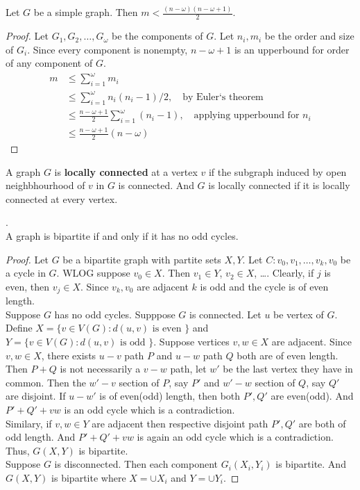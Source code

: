 \begin{exercise}
	Let $G$ be a simple graph.
	Then $m < \frac{(n-\omega)(n-\omega+1)}{2}$.
\end{exercise}
\begin{proof}
	Let $G_1,G_2,\dots,G_\omega$ be the components of $G$.
	Let $n_i,m_i$ be the order and size of $G_i$.
	Since every component is nonempty, $n-\omega+1$ is an upperbound for order of any component of $G$.
	\begin{align*}
		m 
		& \le \sum_{i=1}^\omega m_i\\
		& \le \sum_{i=1}^\omega n_i(n_i-1)/2,\quad \text{by Euler`s theorem}\\
		& \le \frac{n-\omega+1}{2} \sum_{i=1}^\omega (n_i - 1),\quad \text{applying upperbound for $n_i$}\\
		& \le \frac{n-\omega+1}{2} (n - \omega)
	\end{align*}
\end{proof}

\begin{definition}
	A graph $G$ is \textbf{locally connected} at a vertex $v$ if the subgraph induced by open neighbhourhood of $v$ in $G$ is connected.
	And $G$ is locally connected if it is locally connected at every vertex.
\end{definition}

\begin{theorem}.\\
	A graph is bipartite if and only if it has no odd cycles.
\end{theorem}
\begin{proof}
	Let $G$ be a bipartite graph with partite sets $X,Y$.
	Let $C : v_0,v_1,\dots,v_k,v_0$ be a cycle in $G$.
	WLOG suppose $v_0 \in X$.
	Then $v_1 \in Y$, $v_2 \in X$, \dots.
	Clearly, if $j$ is even, then $v_j \in X$.
	Since $v_k,v_0$ are adjacent $k$ is odd and the cycle is of even length.\\

	Suppose $G$ has no odd cycles.
	Supppose $G$ is connected.
	Let $u$ be vertex of $G$.
	Define $X = \{ v \in V(G) : d(u,v) \text{ is even } \}$ and $Y = \{ v \in V(G) : d(u,v) \text{ is odd }\}$.
	Suppose vertices $v,w \in X$ are adjacent.
	Since $v,w \in X$, there exists $u-v$ path $P$ and $u-w$ path $Q$ both are of even length. Then $P+Q$ is not necessarily a $v-w$ path, let $w'$ be the last vertex they have in common. Then the $w'-v$ section of $P$, say $P'$ and $w'-w$ section of $Q$, say $Q'$ are disjoint. If $u-w'$ is of even(odd) length, then both $P',Q'$ are even(odd). And $P'+Q'+vw$ is an odd cycle which is a contradiction.\\

	Similary, if $v,w \in Y$ are adjacent then respective disjoint path $P',Q'$ are both of odd length. And $P'+Q'+vw$ is again an odd cycle which is a contradiction. Thus, $G(X,Y)$ is bipartite.\\

	Suppose $G$ is disconnected. Then each component $G_i(X_i,Y_i)$ is bipartite. And $G(X,Y)$ is bipartite where $X = \cup X_i$ and $Y = \cup Y_i$.
\end{proof}

